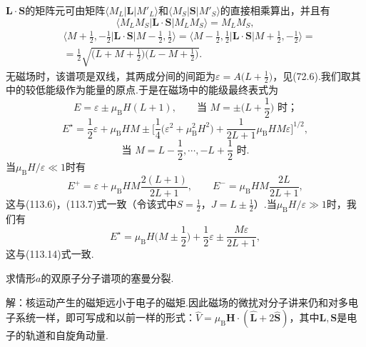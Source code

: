 \begin{xiti}
$\boldsymbol{L}\cdot\boldsymbol{S}$的矩阵元可由矩阵$\langle M_L|\boldsymbol{L}|M'_L\rangle$和$\langle M_S|\boldsymbol{S}|M'_S\rangle$的直接相乘算出，并且有
\begin{equation*}
  \langle M_LM_S|\boldsymbol{L}\cdot\boldsymbol{S}|M_LM_S\rangle=M_LM_S,
\end{equation*}
\begin{equation*}
\begin{aligned}
  &\biggl\langle M+\frac{1}{2},-\frac{1}{2}\biggr|\boldsymbol{L}\cdot\boldsymbol{S}
  \biggl|M-\frac{1}{2},\frac{1}{2}\biggr\rangle
  =\biggl\langle M-\frac{1}{2},\frac{1}{2}\biggr|\boldsymbol{L}\cdot\boldsymbol{S}
  \biggl|M+\frac{1}{2},-\frac{1}{2}\biggr\rangle=\\
  &=\frac{1}{2}\sqrt{\biggl(L+M+\frac{1}{2}\biggr)\biggl(L-M+\frac{1}{2}\biggr)}.
\end{aligned}
\end{equation*}
无磁场时，该谱项是双线，其两成分间的间距为$\varepsilon=A\bigl(L+\frac{1}{2}\bigr)$，见(72.6).我们取其中的较低能级作为能量的原点.于是在磁场中的能级最终表式为
\begin{equation*}
  E=\varepsilon\pm\mu_\mathrm{B}H(L+1),\qquad
  \text{当 }M=\pm\biggl(L+\frac{1}{2}\biggr)\text{ 时；}
\end{equation*}
\begin{equation*}
  E^{\star}=\frac{1}{2}\varepsilon+\mu_\mathrm{B}HM\pm
  \biggl[\frac{1}{4}\bigl(\varepsilon^2+\mu_\mathrm{B}^2H^2\bigr)
  +\frac{1}{2L+1}\mu_\mathrm{B}HM\varepsilon\biggr]^{1/2},
\end{equation*}
\begin{equation*}
  \text{当 }M=L-\frac{1}{2},\cdots,-L+\frac{1}{2}\text{ 时.}
\end{equation*}
当$\mu_\mathrm{B}H/\varepsilon\ll1$时有
\begin{equation*}
  E^{+}=\varepsilon+\mu_\mathrm{B}HM\frac{2(L+1)}{2L+1},\qquad
  E^{-}=\mu_\mathrm{B}HM\frac{2L}{2L+1},
\end{equation*}
这与(113.6)，(113.7)式一致（令该式中$S=\frac{1}{2}$，$J=L\pm\frac{1}{2}$）.当$\mu_\mathrm{B}H/\varepsilon\gg1$时，我们有
\begin{equation*}
  E^{\star}=\mu_\mathrm{B}H\biggl(M\pm\frac{1}{2}\biggr)+\frac{1}{2}\varepsilon
  \pm\frac{M\varepsilon}{2L+1},
\end{equation*}
这与(113.14)式一致.

\quad 求情形$a$的双原子分子谱项的塞曼分裂.

解：核运动产生的磁矩远小于电子的磁矩.因此磁场的微扰对分子讲来仍和对多电子系统一样，即可写成和以前一样的形式：$\hat{V}=\mu_\mathrm{B}\boldsymbol{H}\cdot(\hat{\boldsymbol{L}}+2\hat{\boldsymbol{S}})$，其中$\boldsymbol{L},\boldsymbol{S}$是电子的轨道和自旋角动量.


\end{xiti}
